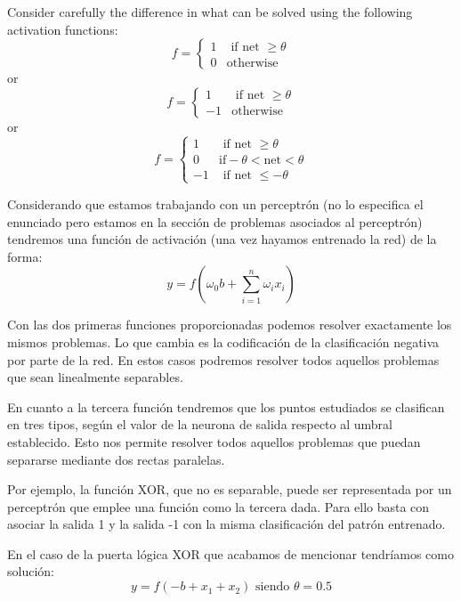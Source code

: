 \begin{problem}[12]
 Consider carefully the difference in what can be solved using the following activation
functions:
\[f=\left\{ \begin{array}{ll}1 & \text{ if net } \geq \theta \\ 0 & \text{otherwise} \end{array}\right.\]
or
\[f=\left\{ \begin{array}{ll}1 & \text{ if net } \geq \theta \\ -1 & \text{otherwise} \end{array}\right.\]
or
\[f=\left\{ \begin{array}{ll}1 & \text{ if net } \geq \theta \\ 0 & \text{if} -\theta < \text{net} < \theta \\ -1 & \text{ if net } \leq -\theta\end{array}\right.\]
\solution

Considerando que estamos trabajando con un perceptrón (no lo especifica el enunciado pero estamos en la sección de problemas asociados al perceptrón) tendremos una función de activación (una vez hayamos entrenado la red) de la forma:
\[y = f\left(ω_0b + \sum_{i=1}^nω_ix_i\right) \]

Con las dos primeras funciones proporcionadas podemos resolver exactamente los mismos problemas. Lo que cambia es la codificación de la clasificación negativa por parte de la red. En estos casos podremos resolver todos aquellos problemas que sean linealmente separables.

En cuanto a la tercera función tendremos que los puntos estudiados se clasifican en tres tipos, según el valor de la neurona de salida respecto al umbral establecido. Esto nos permite resolver todos aquellos problemas que puedan separarse mediante dos rectas paralelas.

Por ejemplo, la función XOR, que no es separable, puede ser representada por un perceptrón que emplee una función como la tercera dada. Para ello basta con asociar la salida 1 y la salida -1 con la misma clasificación del patrón entrenado.

En el caso de la puerta lógica XOR que acabamos de mencionar tendríamos como solución:
\[y=f(-b + x_1+x_2) \text{ siendo } \theta =0.5\]

\end{problem}

